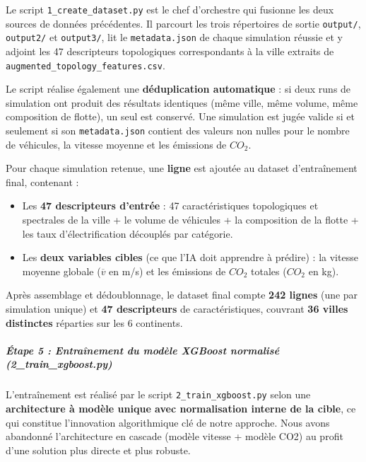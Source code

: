 \documentclass[10pt, a4paper]{article}
\providecommand{\tightlist}{}
\begin{document}
Le script \texttt{1\_create\_dataset.py} est le chef d'orchestre qui
fusionne les deux sources de données précédentes. Il parcourt les trois
répertoires de sortie \texttt{output/}, \texttt{output2/} et
\texttt{output3/}, lit le \texttt{metadata.json} de chaque simulation
réussie et y adjoint les 47 descripteurs topologiques correspondants à
la ville extraits de \texttt{augmented\_topology\_features.csv}.

Le script réalise également une \textbf{déduplication automatique} : si
deux runs de simulation ont produit des résultats identiques (même
ville, même volume, même composition de flotte), un seul est conservé.
Une simulation est jugée valide si et seulement si son
\texttt{metadata.json} contient des valeurs non nulles pour le nombre de
véhicules, la vitesse moyenne et les émissions de \(CO_2\).

Pour chaque simulation retenue, une \textbf{ligne} est ajoutée au
dataset d'entraînement final, contenant :

\begin{itemize}
\tightlist
\item
  Les \textbf{47 descripteurs d'entrée} : 47 caractéristiques
  topologiques et spectrales de la ville + le volume de véhicules + la
  composition de la flotte + les taux d'électrification découplés par
  catégorie.
\item
  Les \textbf{deux variables cibles} (ce que l'IA doit apprendre à
  prédire) : la vitesse moyenne globale (\(\overline{v}\) en m/s) et les
  émissions de \(CO_2\) totales (\(CO_2\) en kg).
\end{itemize}

Après assemblage et dédoublonnage, le dataset final compte \textbf{242
lignes} (une par simulation unique) et \textbf{47 descripteurs} de
caractéristiques, couvrant \textbf{36 villes distinctes} réparties sur
les 6 continents.

\subparagraph{Étape 5 : Entraînement du modèle XGBoost normalisé
(2\_train\_xgboost.py)}\label{uxe9tape-5-entrauxeenement-du-moduxe8le-xgboost-normalisuxe9-2_train_xgboost.py}

L'entraînement est réalisé par le script \texttt{2\_train\_xgboost.py}
selon une \textbf{architecture à modèle unique avec normalisation
interne de la cible}, ce qui constitue l'innovation algorithmique clé de
notre approche. Nous avons abandonné l'architecture en cascade (modèle
vitesse + modèle CO2) au profit d'une solution plus directe et plus
robuste.
\end{document}
